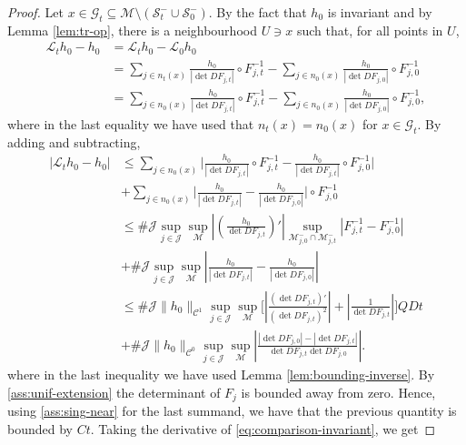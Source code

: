 \documentclass{amsart}
\numberwithin{equation}{section}
\renewcommand{\le}{\leqslant}
\newcommand\cC{{\mathcal C}}
\newcommand\cG{{\mathcal G}}
\newcommand\cJ{{\mathcal J}}
\newcommand\cL{{\mathcal L}}
\newcommand\cM{{\mathcal M}}
\newcommand\cS{{\mathcal S}}
\begin{document}
\begin{proof}
Let \(x \in \cG_t \subseteq \cM \setminus \left(\cS_t^{-} \cup \cS_0^{-}\right)\). By the fact that \(h_0\) is invariant and by Lemma \ref{lem:tr-op}, there is a neighbourhood \(U \ni x\) such that, for all points in \(U\),
\begin{equation}\label{eq:comparison-invariant}
\begin{split}
\cL_t h_0 - h_0 &= \cL_t h_0 - \cL_{0}h_0 \\
&= \sum_{j \in n_t(x)} \frac{h_0}{\left|\det DF_{j,t}\right|} \circ F_{j,t}^{-1} - \sum_{j \in n_0(x)} \frac{h_0}{\left|\det DF_{j,0}\right|} \circ F_{j,0}^{-1}\\
&=\sum_{j \in n_0(x)} \frac{h_0}{\left|\det DF_{j,t}\right|} \circ F_{j,t}^{-1} - \sum_{j \in n_0(x)} \frac{h_0}{\left|\det DF_{j,0}\right|} \circ F_{j,0}^{-1},
\end{split}
\end{equation}
where in the last equality we have used that  \(n_t(x) = n_0(x)\) for \(x \in \cG_t\). By adding and subtracting,
\begin{equation}\label{eq:pre-divisionbyt}
\begin{split}
|\cL_t h_0 - h_0| &\le \sum_{j \in n_0(x)} \biggl|\frac{h_0}{|\det DF_{j,t}|} \circ F_{j,t}^{-1} - \frac{h_0}{|\det DF_{j,t}|}\circ F_{j,0}^{-1} \biggr| \\
&+ \sum_{j \in n_0(x)}\biggl|\frac{h_0}{|\det DF_{j,t}|} - \frac{h_0}{|\det DF_{j,0}|} \biggr| \circ F_{j,0}^{-1}\\
& \le \#\cJ \sup_{j \in \cJ}\sup_{\cM} \left|\left( \frac{h_0}{\det DF_{j,t}}\right)' \right|\sup_{\cM_{j,0}^{-}\cap \cM_{j,t}^{-}}\left|F_{j,t}^{-1}- F_{j,0}^{-1}\right|\\
& + \#\cJ\sup_{j \in \cJ}\sup_{\cM}\left|\frac{h_0}{|\det DF_{j,t}|} - \frac{h_0}{|\det DF_{j,0}|}\right|\\
&\le \#\cJ\|h_0\|_{\cC^1} \sup_{j \in \cJ}\sup_{\cM} \biggl[\left|\frac{(\det DF_{j,t})'}{(\det DF_{j,t})^2}\right| + \left|\frac{1}{\det DF_{j,t}}\right|\biggr] QD t\\
& + \#\cJ \|h_0\|_{\cC^0}\sup_{j \in \cJ}\sup_{\cM}\left|\frac{|\det DF_{j,0}| - |\det DF_{j,t}|}{\det DF_{j,t}\det DF_{j,0}}\right|.
\end{split}
\end{equation}
where in the last inequality we have used Lemma  \ref{lem:bounding-inverse}. By \ref{ass:unif-extension} the determinant of \(F_{j}\) is bounded away from zero. Hence, using \ref{ass:sing-near} for the last summand, we have that the previous quantity is bounded by \(Ct\). Taking the derivative of \eqref{eq:comparison-invariant}, we get

\end{proof}
\end{document}
